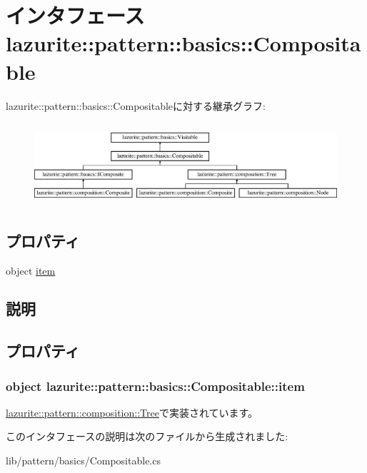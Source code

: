 \hypertarget{interfacelazurite_1_1pattern_1_1basics_1_1_compositable}{
\section{インタフェース lazurite::pattern::basics::Compositable}
\label{interfacelazurite_1_1pattern_1_1basics_1_1_compositable}
}
lazurite::pattern::basics::Compositableに対する継承グラフ:\begin{figure}[H]
\begin{center}
\leavevmode
\includegraphics[height=3.0854cm]{interfacelazurite_1_1pattern_1_1basics_1_1_compositable}
\end{center}
\end{figure}
\subsection*{プロパティ}
\begin{DoxyCompactItemize}
\item 
object \hyperlink{interfacelazurite_1_1pattern_1_1basics_1_1_compositable_a5c6c16d4fcce4b6c5272842c529bf536}{item}
\end{DoxyCompactItemize}


\subsection{説明}


\subsection{プロパティ}
\hypertarget{interfacelazurite_1_1pattern_1_1basics_1_1_compositable_a5c6c16d4fcce4b6c5272842c529bf536}{
\subsubsection[{item}]{\setlength{\rightskip}{0pt plus 5cm}object lazurite::pattern::basics::Compositable::item}}
\label{interfacelazurite_1_1pattern_1_1basics_1_1_compositable_a5c6c16d4fcce4b6c5272842c529bf536}


\hyperlink{classlazurite_1_1pattern_1_1composition_1_1_tree_a2c78ae8ec2f8cb02c6971548c3c1be16}{lazurite::pattern::composition::Tree}で実装されています。

このインタフェースの説明は次のファイルから生成されました:\begin{DoxyCompactItemize}
\item 
lib/pattern/basics/Compositable.cs\end{DoxyCompactItemize}
